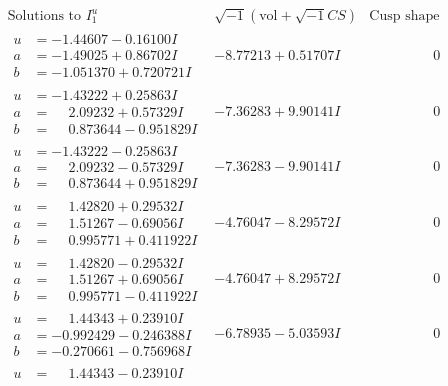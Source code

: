 \documentclass[1p]{elsarticle_modified}
\theoremstyle{definition}
\newcommand{\I}{\sqrt{-1}}
\begin{document}
$$\begin{array}{c|c|c}
\text{Solutions to }I^u_{1}& \I (\text{vol} + \sqrt{-1}CS) & \text{Cusp shape}\\
 \hline 
\begin{aligned}
u &= -1.44607 - 0.16100 I \\
a &= -1.49025 + 0.86702 I \\
b &= -1.051370 + 0.720721 I\end{aligned}
 & -8.77213 + 0.51707 I & \phantom{-0.000000 } 0 \\ \hline\begin{aligned}
u &= -1.43222 + 0.25863 I \\
a &= \phantom{-}2.09232 + 0.57329 I \\
b &= \phantom{-}0.873644 - 0.951829 I\end{aligned}
 & -7.36283 + 9.90141 I & \phantom{-0.000000 } 0 \\ \hline\begin{aligned}
u &= -1.43222 - 0.25863 I \\
a &= \phantom{-}2.09232 - 0.57329 I \\
b &= \phantom{-}0.873644 + 0.951829 I\end{aligned}
 & -7.36283 - 9.90141 I & \phantom{-0.000000 } 0 \\ \hline\begin{aligned}
u &= \phantom{-}1.42820 + 0.29532 I \\
a &= \phantom{-}1.51267 - 0.69056 I \\
b &= \phantom{-}0.995771 + 0.411922 I\end{aligned}
 & -4.76047 - 8.29572 I & \phantom{-0.000000 } 0 \\ \hline\begin{aligned}
u &= \phantom{-}1.42820 - 0.29532 I \\
a &= \phantom{-}1.51267 + 0.69056 I \\
b &= \phantom{-}0.995771 - 0.411922 I\end{aligned}
 & -4.76047 + 8.29572 I & \phantom{-0.000000 } 0 \\ \hline\begin{aligned}
u &= \phantom{-}1.44343 + 0.23910 I \\
a &= -0.992429 - 0.246388 I \\
b &= -0.270661 - 0.756968 I\end{aligned}
 & -6.78935 - 5.03593 I & \phantom{-0.000000 } 0 \\ \hline\begin{aligned}
u &= \phantom{-}1.44343 - 0.23910 I \\

\end{aligned}
\end{array}$$
\end{document}
